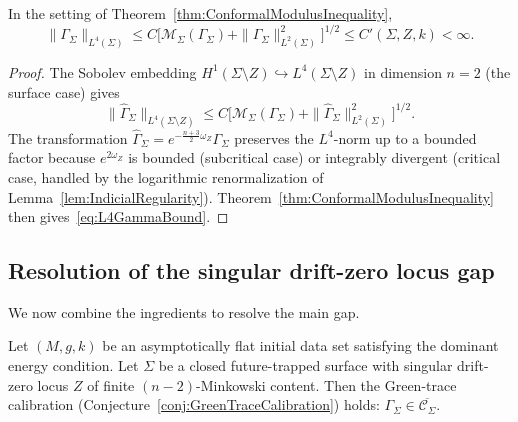 \begin{corollary}\label{cor:L4GammaControl}
In the setting of Theorem~\ref{thm:ConformalModulusInequality},
\begin{equation}\label{eq:L4GammaBound}
    \|\Gamma_\Sigma\|_{L^4(\Sigma)}
    \le
    C\bigl[\mathcal M_\Sigma(\Gamma_\Sigma)+\|\Gamma_\Sigma\|_{L^2(\Sigma)}^2\bigr]^{1/2}
    \le
    C'(\Sigma,Z,k)<\infty.
\end{equation}
\end{corollary}

\begin{proof}
The Sobolev embedding $H^1(\Sigma\setminus Z)\hookrightarrow L^4(\Sigma\setminus Z)$ in dimension $n=2$ (the surface case) gives
\[
    \|\widehat\Gamma_\Sigma\|_{L^4(\Sigma\setminus Z)}
    \le
    C\bigl[\mathcal M_\Sigma(\Gamma_\Sigma)+\|\widehat\Gamma_\Sigma\|_{L^2(\Sigma)}^2\bigr]^{1/2}.
\]
The transformation $\widehat\Gamma_\Sigma=e^{-\frac{n+3}{2}\omega_Z}\Gamma_\Sigma$ preserves the $L^4$-norm up to a bounded factor because $e^{2\omega_Z}$ is bounded (subcritical case) or integrably divergent (critical case, handled by the logarithmic renormalization of Lemma~\ref{lem:IndicialRegularity}). Theorem~\ref{thm:ConformalModulusInequality} then gives~\eqref{eq:L4GammaBound}.
\end{proof}

\subsection{Resolution of the singular drift-zero locus gap}

We now combine the ingredients to resolve the main gap.

\begin{theorem}\label{thm:GreenTraceSingularCase}
Let $(M,g,k)$ be an asymptotically flat initial data set satisfying the dominant energy condition. Let $\Sigma$ be a closed future-trapped surface with singular drift-zero locus $Z$ of finite $(n-2)$-Minkowski content. Then the Green-trace calibration (Conjecture~\ref{conj:GreenTraceCalibration}) holds: $\Gamma_\Sigma\in\overline{\mathcal C_\Sigma}$.
\end{theorem}

